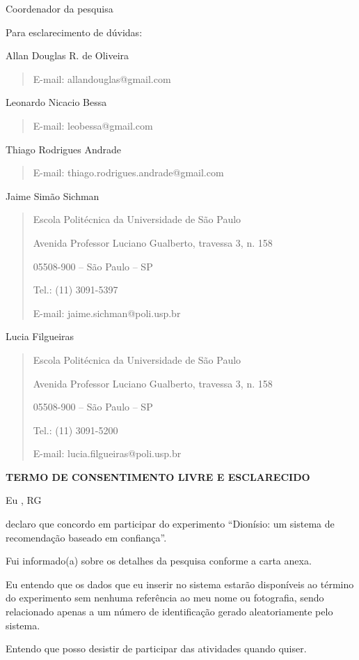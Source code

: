 Coordenador da pesquisa

\vspace{0.2in}

Para esclarecimento de dúvidas:

Allan Douglas R. de Oliveira
\begin{quote}
	E-mail: allandouglas@gmail.com
\end{quote}
Leonardo Nicacio Bessa
\begin{quote}
	E-mail: leobessa@gmail.com
\end{quote}	
Thiago Rodrigues Andrade
\begin{quote}
	E-mail: thiago.rodrigues.andrade@gmail.com
\end{quote}
Jaime Simão Sichman
\begin{quote}
Escola Politécnica da Universidade de São Paulo

Avenida Professor Luciano Gualberto, travessa 3, n. 158

05508-900 – São Paulo – SP

Tel.: (11) 3091-5397

E-mail: jaime.sichman@poli.usp.br
\end{quote}
Lucia Filgueiras
\begin{quote}
Escola Politécnica da Universidade de São Paulo

Avenida Professor Luciano Gualberto, travessa 3, n. 158

05508-900 – São Paulo – SP

Tel.: (11) 3091-5200

E-mail: lucia.filgueiras@poli.usp.br
\end{quote}
\vspace{3.5in}
\centerline{\textbf{TERMO DE CONSENTIMENTO LIVRE E ESCLARECIDO}}

Eu \hspace{9.5cm}, RG

declaro que concordo em participar do experimento ``Dionísio: um sistema de recomendação baseado em confiança''.

Fui informado(a) sobre os detalhes da pesquisa conforme a carta anexa.

Eu entendo que os dados que eu inserir no sistema estarão disponíveis ao término do experimento sem nenhuma referência ao meu nome ou fotografia, sendo relacionado  apenas a um número de identificação gerado aleatoriamente pelo sistema.

Entendo que posso desistir de participar das atividades quando quiser. 

